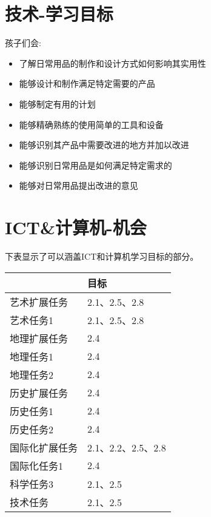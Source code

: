 \section{技术-学习目标}
    孩子们会:\par
    \begin{itemize}
      \item  了解日常用品的制作和设计方式如何影响其实用性
      \item  能够设计和制作满足特定需要的产品
      \item  能够制定有用的计划
      \item  能够精确熟练的使用简单的工具和设备
      \item  能够识别其产品中需要改进的地方并加以改进
      \item  能够识别日常用品是如何满足特定需求的
      \item  能够对日常用品提出改进的意见
    \end{itemize} 

\section{ICT&计算机-机会}
     下表显示了可以涵盖ICT和计算机学习目标的部分。
\begin{table}[h]
\begin{tabular}{l|l}
\hline
\colorbox[gray]{0.95}{任务 & 目标} \\
\hline
艺术扩展任务  & 2.1、2.5、2.8  \\
艺术任务1 & 2.1、2.5、2.8 \\
地理扩展任务   & 2.4  \\
地理任务1  & 2.4  \\
地理任务2  & 2.4  \\
历史扩展任务  & 2.4  \\
历史任务1  & 2.4  \\
历史任务2  & 2.4   \\
国际化扩展任务   & 2.1、2.2、2.5、2.8  \\
国际化任务1  & 2.4   \\
科学任务3  & 2.1、2.5  \\
技术任务   & 2.1、2.5  \\
\hline
\end{tabular}
\end{table}

